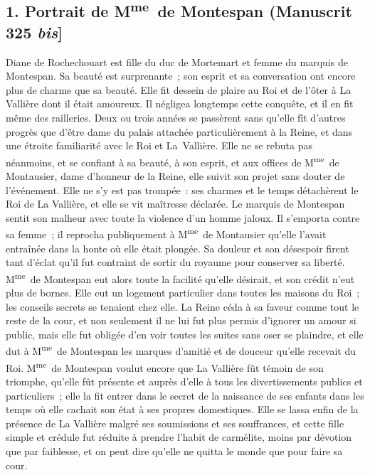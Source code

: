 \documentclass[french,twoside]{book} %
\begin{document}
\subsection[{1. Portrait de Mme de Montespan (Manuscrit 325 bis]}]{1. Portrait de M\textsuperscript{me} de Montespan (Manuscrit 325 {\itshape bis}]}
\noindent Diane de Rochechouart est fille du duc de Mortemart et femme du marquis de Montespan. Sa beauté est surprenante ; son esprit et sa conversation ont encore plus de charme que sa beauté. Elle fit dessein de plaire au Roi et de l’ôter à La Vallière dont il était amoureux. Il négligea longtemps cette conquête, et il en fit même des railleries. Deux ou trois années se passèrent sans qu’elle fît d’autres progrès que d’être dame du palais attachée particulièrement à la Reine, et dans une étroite familiarité avec le Roi et La Vallière. Elle ne se rebuta pas néanmoins, et se confiant à sa beauté, à son esprit, et aux offices de M\textsuperscript{me} de Montausier, dame d’honneur de la Reine, elle suivit son projet sans douter de l’événement. Elle ne s’y est pas trompée : ses charmes et le temps détachèrent le Roi de La Vallière, et elle se vit maîtresse déclarée. Le marquis de Montespan sentit son malheur avec toute la violence d’un homme jaloux. Il s’emporta contre sa femme ; il reprocha publiquement à M\textsuperscript{me} de Montausier qu’elle l’avait entraînée dans la honte où elle était plongée. Sa douleur et son désespoir firent tant d’éclat qu’il fut contraint de sortir du royaume pour conserver sa liberté. M\textsuperscript{me} de Montespan eut alors toute la facilité qu’elle désirait, et son crédit n’eut plus de bornes. Elle eut un logement particulier dans toutes les maisons du Roi ; les conseils secrets se tenaient chez elle. La Reine céda à sa faveur comme tout le reste de la cour, et non seulement il ne lui fut plus permis d’ignorer un amour si public, mais elle fut obligée d’en voir toutes les suites sans oser se plaindre, et elle dut à M\textsuperscript{me} de Montespan les marques d’amitié et de douceur qu’elle recevait du Roi. M\textsuperscript{me} de Montespan voulut encore que La Vallière fût témoin de son triomphe, qu’elle fût présente et auprès d’elle à tous les divertissements publics et particuliers ; elle la fit entrer dans le secret de la naissance de ses enfants dans les temps où elle cachait son état à ses propres domestiques. Elle se lassa enfin de la présence de La Vallière malgré ses soumissions et ses souffrances, et cette fille simple et crédule fut réduite à prendre l’habit de carmélite, moins par dévotion que par faiblesse, et on peut dire qu’elle ne quitta le monde que pour faire sa cour.
\end{document}
